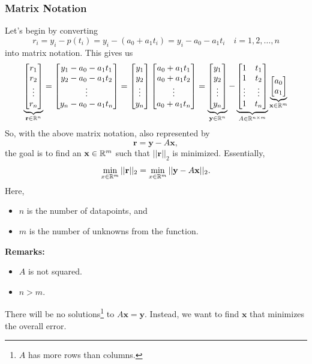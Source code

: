 \documentclass[letterpaper]{article}
\newcommand{\0}{\mathbf{0}}
\newcommand{\y}{\mathbf{y}}
\newcommand{\x}{\mathbf{x}}
\newcommand{\rr}{\mathbf{r}}
\begin{document}
\subsubsection{Matrix Notation}
Let's begin by converting 
\[r_i = y_i - p(t_i) = y_i - (a_0 + a_1 t_i) = y_i - a_0 - a_1 t_i \quad i = 1, 2, \hdots, n\]
into matrix notation. This gives us 
\[\underbrace{\begin{bmatrix}
    r_1 \\ r_2 \\ \vdots \\ r_n
\end{bmatrix}}_{\rr \in \R^n} = \begin{bmatrix}
    y_1 - a_0 - a_1 t_1 \\ 
    y_2 - a_0 - a_1 t_2 \\ 
    \vdots \\ 
    y_n - a_0 - a_1 t_n
\end{bmatrix} = \begin{bmatrix}
    y_1 \\ y_2 \\ \vdots \\ y_n
\end{bmatrix} \begin{bmatrix}
    a_0 + a_1 t_1 \\ 
    a_0 + a_1 t_2 \\
    \vdots \\ 
    a_0 + a_1 t_n
\end{bmatrix} = \underbrace{\begin{bmatrix}
    y_1 \\ y_2 \\ \vdots \\ y_n
\end{bmatrix}}_{\y \in \R^n} - \underbrace{\begin{bmatrix}
    1 & t_1 \\ 
    1 & t_2 \\ 
    \vdots & \vdots \\ 
    1 & t_n
\end{bmatrix}}_{A \in \R^{n \times m}} \underbrace{\begin{bmatrix}
    a_0 \\ a_1
\end{bmatrix}}_{\x \in \R^{m}}\]
So, with the above matrix notation, also represented by 
\[\rr = \y - A\x,\]
the goal is to find an $\x \in \R^m$ such that $||\rr||_2$ is minimized. Essentially, 
\[\min_{x \in \R^m} ||\rr||_2 = \min_{x \in \R^m} ||\y - A\x||_2.\] Here, 
\begin{itemize}
    \item $n$ is the number of datapoints, and
    \item $m$ is the number of unknowns from the function. 
\end{itemize} 
\textbf{Remarks:}
\begin{itemize}
    \item $A$ is not squared.
    \item $n > m$.
\end{itemize} 
There will be no solutions\footnote{$A$ has more rows than columns.} to $A\x = \y$. Instead, we want to find $\x$ that minimizes the overall error.
\end{document}
